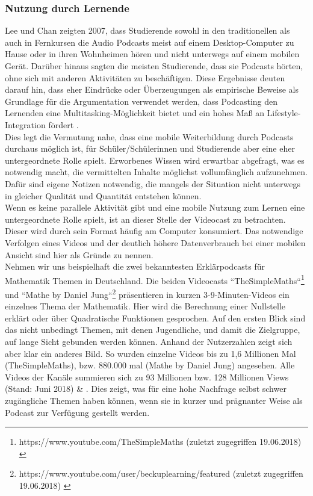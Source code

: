 \documentclass[11pt,a4paper]{scrreprt}
\begin{document}
\subsubsection{Nutzung durch Lernende}
Lee und Chan zeigten 2007, dass Studierende sowohl in den traditionellen als auch in Fernkursen die Audio Podcasts meist auf einem Desktop-Computer zu Hause oder in ihren Wohnheimen hören und nicht unterwegs auf einem mobilen Gerät. Darüber hinaus sagten die meisten Studierende, dass sie Podcasts hörten, ohne sich mit anderen Aktivitäten zu beschäftigen. Diese Ergebnisse deuten darauf hin, dass eher Eindrücke oder Überzeugungen als empirische Beweise als Grundlage für die Argumentation verwendet werden, dass Podcasting den Lernenden eine Multitasking-Möglichkeit bietet und ein hohes Maß an Lifestyle-Integration fördert \cite{LeeChan2007}.\\
Dies legt die Vermutung nahe, dass eine mobile Weiterbildung durch Podcasts durchaus möglich ist, für Schüler/Schülerinnen und Studierende aber eine eher untergeordnete Rolle spielt. Erworbenes Wissen wird erwartbar abgefragt, was es notwendig macht, die vermittelten Inhalte möglichst vollumfänglich aufzunehmen. Dafür sind eigene Notizen notwendig, die mangels der Situation nicht unterwegs in gleicher Qualität und Quantität entstehen können.\\
Wenn es keine parallele Aktivität gibt und eine mobile Nutzung zum Lernen eine untergeordnete Rolle spielt, ist an dieser Stelle der Videocast zu betrachten. Dieser wird durch sein Format häufig am Computer konsumiert. Das notwendige Verfolgen eines Videos und der deutlich höhere Datenverbrauch bei einer mobilen Ansicht sind hier als Gründe zu nennen.\\
Nehmen wir uns beispielhaft die zwei bekanntesten Erklärpodcasts für Mathematik Themen in Deutschland. Die beiden Videocasts ``TheSimpleMaths``\footnote{https://www.youtube.com/TheSimpleMaths (zuletzt zugegriffen 19.06.2018) \cite{YouTubeMath_2011}} und ``Mathe by Daniel Jung``\footnote{https://www.youtube.com/user/beckuplearning/featured (zuletzt zugegriffen 19.06.2018) \cite{YouTubeJung_2011}} präsentieren in kurzen 3-9-Minuten-Videos ein einzelnes Thema der Mathematik. Hier wird die Berechnung einer Nullstelle erklärt oder über Quadratische Funktionen gesprochen. Auf den ersten Blick sind das nicht unbedingt Themen, mit denen Jugendliche, und damit die Zielgruppe, auf lange Sicht gebunden werden können. Anhand der Nutzerzahlen zeigt sich aber klar ein anderes Bild. So wurden einzelne Videos bis zu 1,6 Millionen Mal (TheSimpleMaths), bzw. 880.000 mal (Mathe by Daniel Jung) angesehen. Alle Videos der Kanäle summieren sich zu  93 Millionen bzw. 128 Millionen Views (Stand: Juni 2018) \cite{YouTubeMath_2011} \& \cite{YouTubeJung_2011}. Dies zeigt, was für eine hohe Nachfrage selbst schwer zugängliche Themen haben können, wenn sie in kurzer und prägnanter Weise als Podcast zur Verfügung gestellt werden.\\
\end{document}
